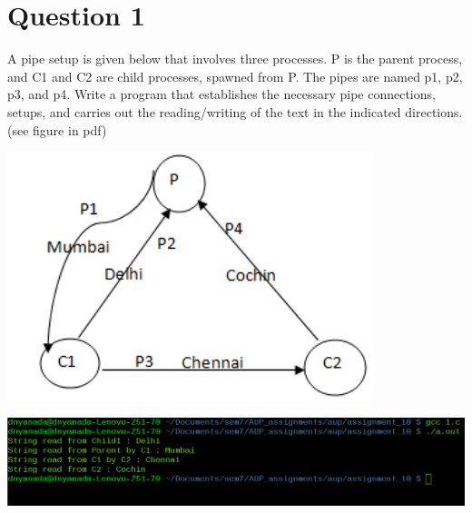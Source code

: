 \documentclass[main.tex]{subfiles}
\begin{document}
\section{Question 1}
A pipe setup is given below that involves three processes. P is the parent
process, and C1 and C2 are child processes, spawned from P. The pipes are named
p1, p2, p3, and p4. Write a program that establishes the necessary pipe
connections, setups, and carries out the reading/writing of the text in the
indicated directions. (see figure in pdf)

\includegraphics[width=0.8\textwidth]{figures/q1.png}


\includegraphics[width=\textwidth]{figures/1_output.png}
\end{document}
